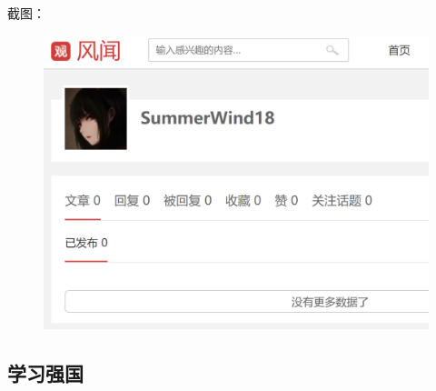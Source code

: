 \documentclass{article}
\begin{document}
截图：
\begin{figure}[H]
    \centering
    \includegraphics[scale=0.28]{gcz}
    \label{fig:gcz}
\end{figure}

\subsection{学习强国}
\end{document}
